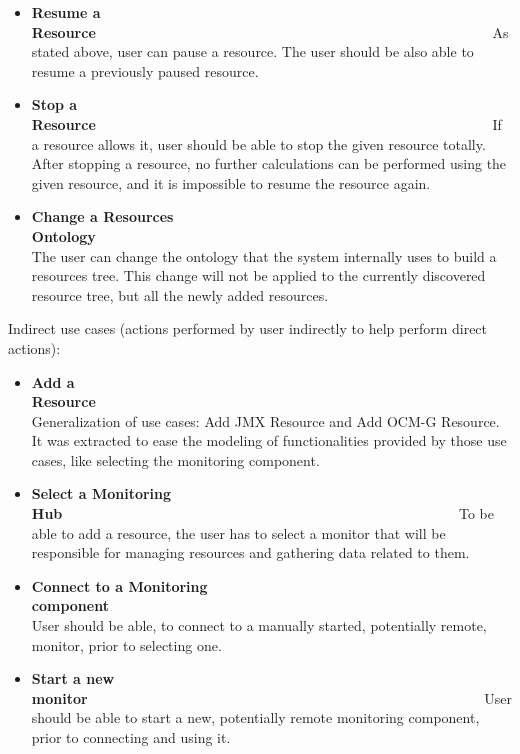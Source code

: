 \begin{itemize}
\item {\bf Resume a Resource}~~~~~~~~~~~~~~~~~~~~~~~~~~~~~~~~~~~~~~~~~~~~~~~~~~~~~~~~\linebreak
As stated above, user can pause a resource. The user should be also able to resume a previously paused resource.

\item {\bf Stop a Resource}~~~~~~~~~~~~~~~~~~~~~~~~~~~~~~~~~~~~~~~~~~~~~~~~~~~~~~~~\linebreak
If a resource allows it, user should be able to stop the given resource totally. After stopping a resource, no further calculations can be performed using the given resource, and it is impossible to resume the resource again.

\item {\bf Change a Resources Ontology}~~~~~~~~~~~~~~~~~~~~~~~~~~~~~~~~~~~~~~~~~~~~~~~~~~~~~~~~\linebreak
The user can change the ontology that the system internally uses to build a resources tree. This change will not  be applied to the currently discovered resource tree, but all the newly added resources.

\end{itemize}


Indirect use cases (actions performed by user indirectly to help perform direct actions):

\begin{itemize}

\item {\bf Add a Resource}~~~~~~~~~~~~~~~~~~~~~~~~~~~~~~~~~~~~~~~~~~~~~~~~~~~~~~~~\linebreak
Generalization of use cases: Add JMX Resource and Add OCM-G Resource. It was extracted to ease the modeling of functionalities provided by those use cases, like selecting the monitoring component.

\item {\bf Select a Monitoring Hub}~~~~~~~~~~~~~~~~~~~~~~~~~~~~~~~~~~~~~~~~~~~~~~~~~~~~~~~~\linebreak
To be able to add a resource, the user has to select a monitor that will be responsible for managing resources and gathering data related to them.

\item {\bf Connect to a Monitoring component}~~~~~~~~~~~~~~~~~~~~~~~~~~~~~~~~~~~~~~~~~~~~~~~~~~~~~~~~\linebreak
User should be able, to connect to a manually started, potentially remote, monitor, prior to selecting one.

\item {\bf Start a new monitor}~~~~~~~~~~~~~~~~~~~~~~~~~~~~~~~~~~~~~~~~~~~~~~~~~~~~~~~~\linebreak
User should be able to start a new, potentially remote monitoring component, prior to connecting and using it.

\end{itemize}

